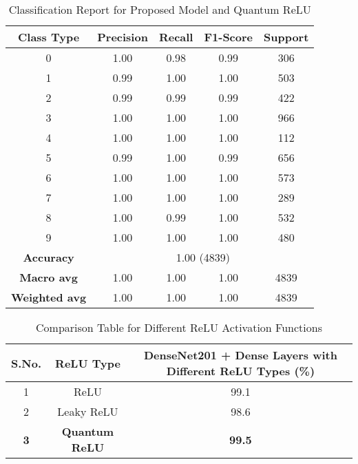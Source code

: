 \documentclass[12pt, English]{article}
\begin{document}
\begin{normalsize}
\begin{table}[htbp]
  \centering
  \renewcommand{\thetable}{6.4}
  \caption{Classification Report for Proposed Model and Quantum ReLU}
  \label{tab:classification_quantum_relu}
  \begin{tabular}{|c|c|c|c|c|}
    \hline
    \textbf{Class Type} & \textbf{Precision} & \textbf{Recall} & \textbf{F1-Score} & \textbf{Support} \\
    \hline
    0 & 1.00 & 0.98 & 0.99 & 306 \\
    \hline
    1 & 0.99 & 1.00 & 1.00 & 503 \\
    \hline
    2 & 0.99 & 0.99 & 0.99 & 422 \\
    \hline
    3 & 1.00 & 1.00 & 1.00 & 966 \\
    \hline
    4 & 1.00 & 1.00 & 1.00 & 112 \\
    \hline
    5 & 0.99 & 1.00 & 0.99 & 656 \\
    \hline
    6 & 1.00 & 1.00 & 1.00 & 573 \\
    \hline
    7 & 1.00 & 1.00 & 1.00 & 289 \\
    \hline
    8 & 1.00 & 0.99 & 1.00 & 532 \\
    \hline
    9 & 1.00 & 1.00 & 1.00 & 480 \\
    \hline
    \textbf{Accuracy} & \multicolumn{4}{|c|}{1.00 (4839)} \\
    \hline
    \textbf{Macro avg} & 1.00 & 1.00 & 1.00 & 4839 \\
    \hline
    \textbf{Weighted avg} & 1.00 & 1.00 & 1.00 & 4839 \\
    \hline
  \end{tabular}
\end{table}


\begin{table}[htbp]
  \centering
  \renewcommand{\thetable}{6.5}
  \caption{Comparison Table for Different ReLU Activation Functions}
  \label{tab:comparison}
  \begin{tabular}{|c|c|c|}
  \hline
    \textbf{S.No.} & \textbf{ReLU Type} & \textbf{DenseNet201 + Dense Layers with Different ReLU Types (\%)} \\
    \hline
    1 & ReLU & 99.1 \\
    \hline
    2 & Leaky ReLU & 98.6 \\
    \hline
    \textbf{3} & \textbf{Quantum ReLU }& \textbf{99.5} \\
    \hline
  \end{tabular}
\end{table}


\end{normalsize}
\end{document}
